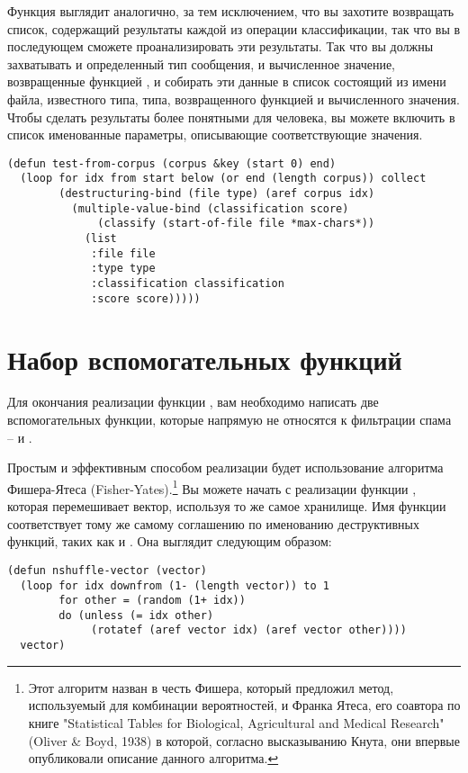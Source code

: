 Функция  выглядит аналогично, за тем исключением, что вы захотите
возвращать список, содержащий результаты каждой из операции классификации, так что вы в
последующем сможете проанализировать эти результаты.  Так что вы должны захватывать и
определенный тип сообщения, и вычисленное значение, возвращенные функцией ,
и собирать эти данные в список состоящий из имени файла, известного типа, типа,
возвращенного функцией  и вычисленного значения.  Чтобы сделать результаты
более понятными для человека, вы можете включить в список именованные параметры,
описывающие соответствующие значения.

\begin{lstlisting}
(defun test-from-corpus (corpus &key (start 0) end)
  (loop for idx from start below (or end (length corpus)) collect
        (destructuring-bind (file type) (aref corpus idx)
          (multiple-value-bind (classification score)
              (classify (start-of-file file *max-chars*))
            (list 
             :file file
             :type type
             :classification classification
             :score score)))))
\end{lstlisting}


\section{Набор вспомогательных функций}

Для окончания реализации функции , вам необходимо написать две
вспомогательных функции, которые напрямую не относятся к фильтрации спама --
 и .

Простым и эффективным способом реализации  будет использование
алгоритма Фишера-Ятеса (Fisher-Yates).\footnote{Этот алгоритм назван в честь Фишера,
  который предложил метод, используемый для комбинации вероятностей, и Франка Ятеса, его
  соавтора по книге "Statistical Tables for Biological, Agricultural and Medical Research"
  (Oliver \& Boyd, 1938) в которой, согласно высказыванию Кнута, они впервые опубликовали
  описание данного алгоритма.}  Вы можете начать с реализации функции
, которая перемешивает вектор, используя то же самое хранилище.  Имя
функции соответствует тому же самому соглашению по именованию деструктивных функций, таких
как  и .  Она выглядит следующим образом:

\begin{lstlisting}
(defun nshuffle-vector (vector)
  (loop for idx downfrom (1- (length vector)) to 1
        for other = (random (1+ idx))
        do (unless (= idx other)
             (rotatef (aref vector idx) (aref vector other))))
  vector)
\end{lstlisting}


